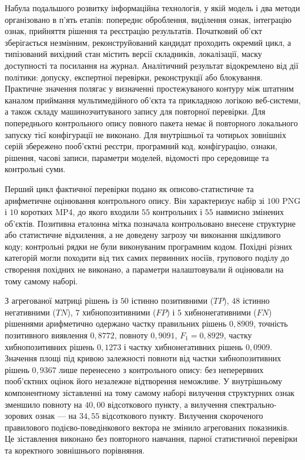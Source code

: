 Набула подальшого розвитку інформаційна технологія, у якій модель і два методи організовано в п’ять етапів: попереднє оброблення, виділення ознак, інтеграцію ознак, прийняття рішення та реєстрацію результатів. Початковий об’єкт зберігається незмінним, реконструйований кандидат проходить окремий цикл, а типізований вихідний стан містить версії складників, локалізації, маску доступності та посилання на журнал. Аналітичний результат відокремлено від дії політики: допуску, експертної перевірки, реконструкції або блокування. Практичне значення полягає у визначенні простежуваного контуру між штатним каналом приймання мультимедійного об’єкта та прикладною логікою веб-системи, а також складу машинозчитуваного запису для повторної перевірки. Для попереднього контрольного опису повного пакета немає й повторного локального запуску тієї конфігурації не виконано. Для внутрішньої та чотирьох зовнішніх серій збережено пооб’єктні реєстри, програмний код, конфігурацію, ознаки, рішення, часові записи, параметри моделей, відомості про середовище та контрольні суми.

Перший цикл фактичної перевірки подано як описово-статистичне та арифметичне оцінювання контрольного опису. Він характеризує набір зі $100$ PNG і $10$ коротких MP4, до якого входили $55$ контрольних і $55$ навмисно змінених об’єктів. Позитивна еталонна мітка позначала контрольовано внесене структурне або статистичне відхилення, а не доведену загрозу чи виконання шкідливого коду; контрольні рядки не були виконуваним програмним кодом. Похідні різних категорій могли походити від тих самих первинних носіїв, групового поділу до створення похідних не виконано, а параметри налаштовували й оцінювали на тому самому наборі.

З агрегованої матриці рішень із $50$ істинно позитивними ($TP$), $48$ істинно негативними ($TN$), $7$ хибнопозитивними ($FP$) і $5$ хибнонегативними ($FN$) рішеннями арифметично одержано частку правильних рішень $0{,}8909$, точність позитивного виявлення $0{,}8772$, повноту $0{,}9091$, $F_1=0{,}8929$, частку хибнопозитивних рішень $0{,}1273$ і частку хибнонегативних рішень $0{,}0909$. Значення площі під кривою залежності повноти від частки хибнопозитивних рішень $0{,}9367$ лише перенесено з контрольного опису: без неперервних пооб’єктних оцінок його незалежне відтворення неможливе. У внутрішньому компонентному зіставленні на тому самому наборі вилучення структурних ознак зменшило повноту на $40{,}00$ відсоткового пункту, а вилучення спектрально-зорових ознак --- на $34{,}55$ відсоткового пункту. Вилучення скороченого правилового подієво-поведінкового вектора не змінило агрегованих показників. Це зіставлення виконано без повторного навчання, парної статистичної перевірки та коректного зовнішнього порівняння.

